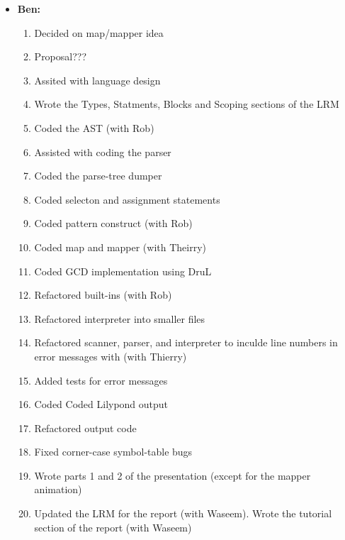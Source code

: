 \begin{itemize}
\item \textbf{Ben:}
\begin{enumerate}
	\item Decided on map/mapper idea
	\item Proposal???
	\item Assited with language design
	\item Wrote the Types, Statments, Blocks and Scoping sections of the LRM
	\item Coded the AST (with Rob)
	\item Assisted with coding the parser
	\item Coded the parse-tree dumper
	\item Coded selecton and assignment statements
	\item Coded pattern construct (with Rob)
	\item Coded map and mapper (with Theirry)
	\item Coded GCD implementation using DruL
	\item Refactored built-ins (with Rob)
	\item Refactored interpreter into smaller files
	\item Refactored scanner, parser, and interpreter to inculde line numbers in error messages with (with Thierry)
	\item Added tests for error messages
	\item Coded Coded Lilypond output
	\item Refactored output code
	\item Fixed corner-case symbol-table bugs
	\item Wrote parts 1 and 2 of the presentation (except for the mapper animation)
	\item Updated the LRM for the report (with Waseem).  Wrote the tutorial section of the report (with Waseem)
\end{enumerate}


\end{itemize}
